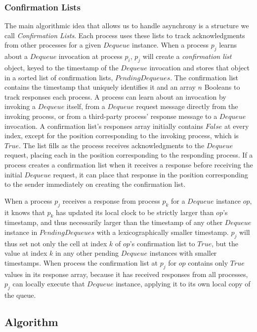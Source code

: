 \documentclass[a4paper,anonymous,USenglish]{lipics-v2021} %
\theoremstyle{definition}
\begin{document}
\subsubsection{Confirmation Lists}\label{sec:confLists}
The main algorithmic idea that allows us to handle asynchrony is a structure we call \emph{Confirmation Lists}.  Each process uses these lists to track acknowledgments from other processes for a given $Dequeue$ instance.  When a process $p_j$ learns about a $Dequeue$ invocation at process $p_i$, $p_j$ will create a \emph{confirmation list} object, keyed to the timestamp of the $Dequeue$ invocation and stores that object in a sorted list of confirmation lists, $PendingDequeues$.  The confirmation list contains the timestamp that uniquely identifies it and an array $n$ Booleans to track responses each process.  A process can learn about an invocation by invoking a $Dequeue$ itself, from a $Dequeue$ request message directly from the invoking process, or from a third-party process' response message to a $Dequeue$ invocation.  A confirmation list's responses array initially contains $False$ at every index, except for the position corresponding to the invoking process, which is $True$.  The list fills as the process receives acknowledgments to the $Dequeue$ request, placing each in the position corresponding to the responding process.  If a process creates a confirmation list when it receives a response before receiving the initial $Dequeue$ request, it can place that response in the position corresponding to the sender immediately on creating the confirmation list.

When a process $p_j$ receives a response from process $p_k$ for a $Dequeue$ instance $op$, it knows that $p_k$ has updated its local clock to be strictly larger than $op$'s timestamp, and thus necessarily larger than the timestamp of any other $Dequeue$ instance in $PendingDequeues$ with a lexicographically smaller timestamp.  $p_j$ will thus set not only the cell at index $k$ of $op$'s confirmation list to $True$, but the value at index $k$ in any other pending $Dequeue$ instances with smaller timestamps.  When process the confirmation list at $p_j$ for $op$ contains only $True$ values in its response array, because it has received responses from all processes, $p_j$ can locally execute that $Dequeue$ instance, applying it to its own local copy of the queue.  

\subsection{Algorithm}
\end{document}
